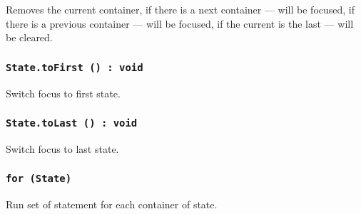 Removes the current container, if there is a next container — will be focused, if there is a previous container — will be focused, if the current is the last — will be cleared.

\subsubsection{\texttt{State.toFirst () : void}}

Switch focus to first state.

\subsubsection{\texttt{State.toLast () : void}}

Switch focus to last state.

\subsubsection{\texttt{for (State) {}}}

Run set of statement for each container of state.
